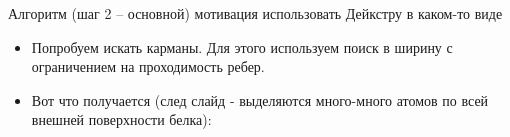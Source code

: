 \documentclass[10pt, xcolor={dvipsnames}]{beamer}
\begin{document}
\begin{frame}{Алгоритм (шаг 2 -- основной) }{мотивация использовать Дейкстру в каком-то виде}
\begin{itemize}
\item Попробуем искать карманы. Для этого используем поиск в ширину с ограничением на проходимость ребер. 
\item Вот что получается (след слайд - выделяются много-много атомов по всей внешней поверхности белка):
\end{itemize}
\begin{center}
\end{center}
\end{frame}
\end{document}
